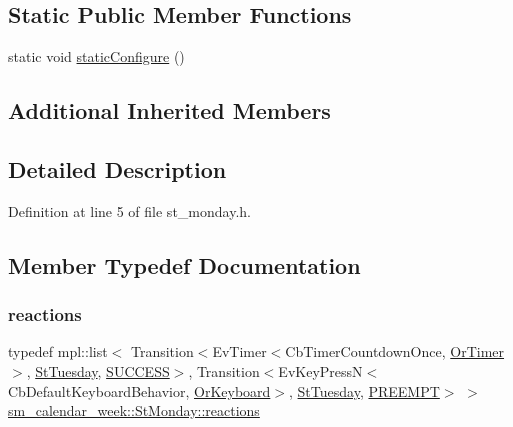 \subsection*{Static Public Member Functions}
\begin{DoxyCompactItemize}
\item 
static void \hyperlink{structsm__calendar__week_1_1StMonday_a2fae8eddd6ad1990e31982aa044f34eb}{static\+Configure} ()
\end{DoxyCompactItemize}
\subsection*{Additional Inherited Members}


\subsection{Detailed Description}


Definition at line 5 of file st\+\_\+monday.\+h.



\subsection{Member Typedef Documentation}
\mbox{\label{structsm__calendar__week_1_1StMonday_a6fee9231d13553ae7370225d9b1f28f9}} 
\subsubsection{\texorpdfstring{reactions}{reactions}}
{\footnotesize\ttfamily typedef mpl\+::list$<$ Transition$<$Ev\+Timer$<$Cb\+Timer\+Countdown\+Once, \hyperlink{classsm__calendar__week_1_1OrTimer}{Or\+Timer}$>$, \hyperlink{structsm__calendar__week_1_1StTuesday}{St\+Tuesday}, \hyperlink{classSUCCESS}{S\+U\+C\+C\+E\+SS}$>$, Transition$<$Ev\+Key\+PressN$<$Cb\+Default\+Keyboard\+Behavior, \hyperlink{classsm__calendar__week_1_1OrKeyboard}{Or\+Keyboard}$>$, \hyperlink{structsm__calendar__week_1_1StTuesday}{St\+Tuesday}, \hyperlink{classPREEMPT}{P\+R\+E\+E\+M\+PT}$>$ $>$ \hyperlink{structsm__calendar__week_1_1StMonday_a6fee9231d13553ae7370225d9b1f28f9}{sm\+\_\+calendar\+\_\+week\+::\+St\+Monday\+::reactions}}



